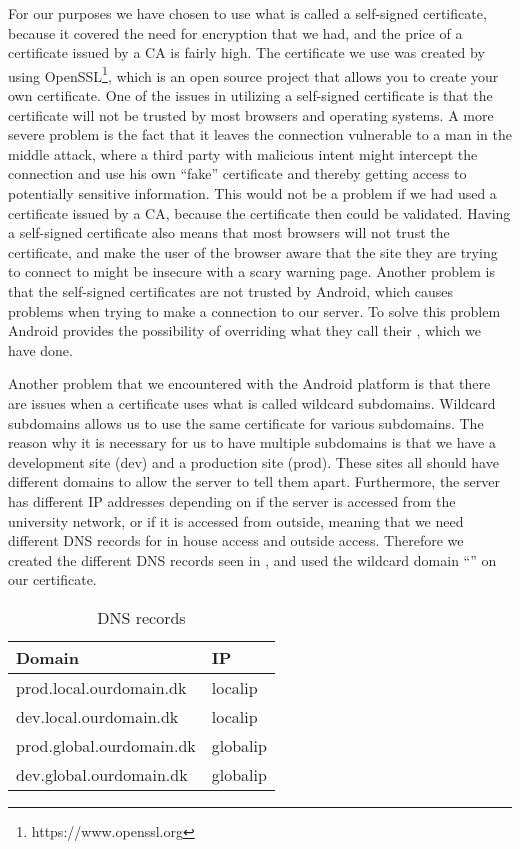 For our purposes we have chosen to use what is called a self-signed certificate, because it covered the need for encryption that we had, and the price of a certificate issued by a CA is fairly high. The certificate we use was created by using OpenSSL\footnote{https://www.openssl.org}, which is an open source project that allows you to create your own certificate. One of the issues in utilizing a self-signed certificate is that the certificate will not be trusted by most browsers and operating systems. A more severe problem is the fact that it leaves the connection vulnerable to a man in the middle attack, where a third party with malicious intent might intercept the connection and use his own ``fake'' certificate and thereby getting access to potentially sensitive information. This would not be a problem if we had used a certificate issued by a CA, because the certificate then could be validated. Having a self-signed certificate also means that most browsers will not trust the certificate, and make the user of the browser aware that the site they are trying to connect to might be insecure with a scary warning page. 
Another problem is that the self-signed certificates are not trusted by Android, which causes problems when trying to make a connection to our server. To solve this problem Android provides the possibility of overriding what they call their , which we have done. 


Another problem that we encountered with the Android platform is that there are issues when a certificate uses what is called wildcard subdomains. Wildcard subdomains allows us to use the same certificate for various subdomains. The reason why it is necessary for us to have multiple subdomains is that we have a development site (dev) and a production site (prod). These sites all should have different domains to allow the server to tell them apart. Furthermore, the server has different IP addresses depending on if the server is accessed from the university network, or if it is accessed from outside, meaning that we need different DNS records for in house access and outside access. Therefore we created the different DNS records seen in , and used the wildcard domain ``'' on our certificate.

\begin{table}[!htbp]
	\centering
	\begin{tabular}{|l|l|} \hline
		\textbf{Domain}				& \textbf{IP}	\\ \hline
		prod.local.ourdomain.dk 	& localip		\\ \hline 
		dev.local.ourdomain.dk 		& localip		\\ \hline
		prod.global.ourdomain.dk 	& globalip		\\ \hline
		dev.global.ourdomain.dk 	& globalip		\\ \hline
	\end{tabular}
	\caption{DNS records}
	\label{tab:dns}
\end{table}


